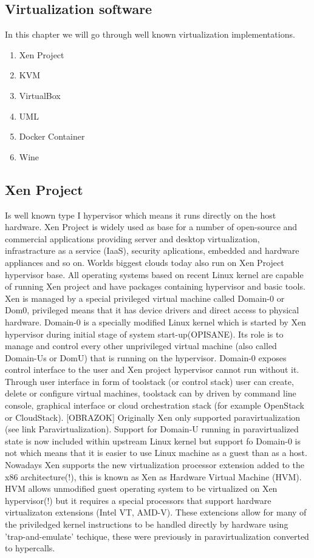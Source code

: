 \begin{enumerate}
\chapter{Virtualization software}
In this chapter we will go through well known virtualization implementations.
\begin{enumerate}
\item Xen Project
\item KVM
\item VirtualBox
\item UML
\item Docker Container
\item Wine
\end{enumerate}

\section{Xen Project}
Is well known type I hypervisor which means it runs directly on the host hardware. Xen Project is widely used as base for a number of open-source and commercial applications providing server and desktop virtualization, infrastracture as a service (IaaS), security aplications, embedded and hardware appliances and so on. Worlds biggest clouds today also run on Xen Project hypervisor base. All operating systems based on recent Linux kernel are capable of running Xen project and have packages containing hypervisor and basic tools.
Xen is managed by a special privileged virtual machine called Domain-0 or Dom0, privileged means that it has device drivers and direct access to physical hardware. Domain-0 is a specially modified Linux kernel which is started by Xen hypervisor during initial stage of system start-up(OPISANE). Its role is to manage and control every other unprivileged virtual machine (also called Domain-Us or DomU) that is running on the hypervisor. Domain-0 exposes control interface to the user and Xen project hypervisor cannot run without it. Through user interface in form of toolstack (or control stack) user can create, delete or configure virtual machines, toolstack can by driven by command line console, graphical interface or cloud orchestration stack (for example OpenStack or CloudStack). [OBRAZOK]
Originally Xen only supported paravirtualization (see link Paravirtualization). Support for Domain-U running in paravirtualized state is now included within upstream Linux kernel but support fo Domain-0 is not which means that it is easier to use Linux machine as a guest than as a host. Nowadays Xen supports the new virtualization processor extension added to the x86 architecture(!), this is known as Xen as Hardware Virtual Machine (HVM). HVM allows unmodified guest operating system to be virtualized on Xen hypervisor(!) but it requires a special processors that support hardware virtualizaton extensions (Intel VT, AMD-V). These extencions allow for many of the priviledged kernel instructions to be handled directly by hardware using 'trap-and-emulate' techique, these were previously in paravirtualization converted to hypercalls.

\end{enumerate}
